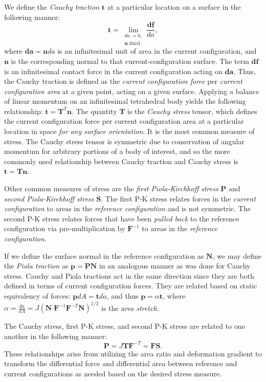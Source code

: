 We define the \textit{Cauchy traction} $\bm{t}$ at a particular location on a surface in the following manner:
\begin{equation}
\bm{t} = \lim_{\substack{{da} \rightarrow 0, \\ {\bm{n} \text{\ fixed}}}} \frac{{\bm{df}}}{da},
\end{equation}
where $\bm{da} = \bm{n}da$ is an infinitesimal unit of area in the current configuration, and $\bm{n}$ is the corresponding normal to that current-configuration surface. The term $\bm{df}$ is an infinitesimal contact force in the current configuration acting on $\bm{da}$. Thus, the Cauchy traction is defined as the \textit{current configuration force} per \textit{current configuration area} at a given point, acting on a given surface. Applying a balance of linear momentum on an infinitesimal tetrahedral body yields the following relationship: $\bm{t} = \bm{T}^T\bm{n}$. The quantity $\bm{T}$ is the \textit{Cauchy stress} tensor, which defines the current configuration force per current configuration area at a particular location in space \textit{for any surface orientation}. It is the most common measure of stress. The Cauchy stress tensor is symmetric due to conservation of angular momentum for arbitrary portions of a body of interest, and so the more commonly used relationship between Cauchy traction and Cauchy stress is $\bm{t} = \bm{T}\bm{n}$.

Other common measures of stress are the \textit{first Piola-Kirchhoff stress} $\bm{P}$ and \textit{second Piola-Kirchhoff stress} $\bm{S}$. The first P-K stress relates forces in the \textit{current configuration} to areas in the \textit{reference configuration} and is not symmetric. The second P-K stress relates forces that have been \textit{pulled back} to the reference configuration via pre-multiplication by $\bm{F}^{-1}$ to areas in the \textit{reference configuration}.

If we define the surface normal in the reference configuration as $\bm{N}$, we may define the \textit{Piola traction} as $\bm{p} = \bm{P}\bm{N}$ in an analogous manner as was done for Cauchy stress. Cauchy and Piola tractions act in the same direction since they are both defined in terms of current configuration forces. They are related based on static equivalency of forces: $\bm{p}dA = \bm{t}da$, and thus $\bm{p} = \alpha\bm{t}$, where $\alpha = \frac{da}{dA} = J\left(\bm{N} \bm{\cdot} \bm{F}^{-1}\bm{F}^{-T}\bm{N}\right)^{1/2}$ is the \textit{area stretch}.

The Cauchy stress, first P-K stress, and second P-K stress are related to one another in the following manner:
\begin{equation}
\bm{P} = J\bm{T}\bm{F}^{-T} = \bm{F}\bm{S}.
\end{equation}
These relationships arise from utilizing the area ratio and deformation gradient to transform the differential force and differential area between reference and current configurations as needed based on the desired stress measure.

